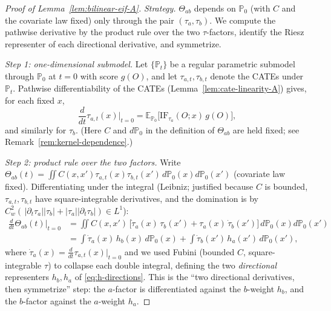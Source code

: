 \begin{proof}[Proof of Lemma~\ref{lem:bilinear-eif-A}]
\emph{Strategy.} $\Theta_{ab}$ depends on $\mathbb{P}_0$ (with $C$ and the covariate law
fixed) only through the pair $(\tau_a,\tau_b)$. We compute the pathwise derivative by the
product rule over the two $\tau$-factors, identify the Riesz representer of each directional
derivative, and symmetrize.

\emph{Step 1: one-dimensional submodel.} Let $\{\mathbb{P}_t\}$ be a regular parametric submodel
through $\mathbb{P}_0$ at $t=0$ with score $g(O)$, and let $\tau_{a,t},\tau_{b,t}$ denote the
CATEs under $\mathbb{P}_t$. Pathwise differentiability of the CATEs (Lemma~\ref{lem:cate-linearity-A})
gives, for each fixed $x$,
\begin{equation}
\frac{d}{dt}\tau_{a,t}(x)\Big|_{t=0}
   = \mathbb{E}_{\mathbb{P}_0}\!\big[\mathrm{IF}_{\tau_a}(O;x)\,g(O)\big],
\label{eq:tau-derivative}
\end{equation}
and similarly for $\tau_b$. (Here $C$ and $d\mathbb{P}_0$ in the definition of $\Theta_{ab}$ are
held fixed; see Remark~\ref{rem:kernel-dependence}.)

\emph{Step 2: product rule over the two factors.} Write
$\Theta_{ab}(t)=\iint C(x,x')\tau_{a,t}(x)\tau_{b,t}(x')\,d\mathbb{P}_0(x)d\mathbb{P}_0(x')$
(covariate law fixed). Differentiating under the integral (Leibniz; justified because $C$ is
bounded, $\tau_{a,t},\tau_{b,t}$ have square-integrable derivatives, and the domination is by
$C_w^2(\,|\partial_t\tau_a||\tau_b| + |\tau_a||\partial_t\tau_b|)\in L^1$):
\begin{align}
\frac{d}{dt}\Theta_{ab}(t)\Big|_{t=0}
 &= \iint C(x,x')\,\Big[\dot\tau_a(x)\,\tau_b(x') + \tau_a(x)\,\dot\tau_b(x')\Big]
     \,d\mathbb{P}_0(x)d\mathbb{P}_0(x') \nonumber\\
 &= \int \dot\tau_a(x)\,h_b(x)\,d\mathbb{P}_0(x)
  + \int \dot\tau_b(x')\,h_a(x')\,d\mathbb{P}_0(x'),
\label{eq:productrule}
\end{align}
where $\dot\tau_a(x)=\tfrac{d}{dt}\tau_{a,t}(x)|_{t=0}$ and we used Fubini (bounded $C$,
square-integrable $\tau$) to collapse each double integral, defining the two \emph{directional}
representers $h_b,h_a$ of \eqref{eq:h-directions}. This is the ``two directional derivatives,
then symmetrize'' step: the $a$-factor is differentiated against the $b$-weight $h_b$, and the
$b$-factor against the $a$-weight $h_a$.


\end{proof}
